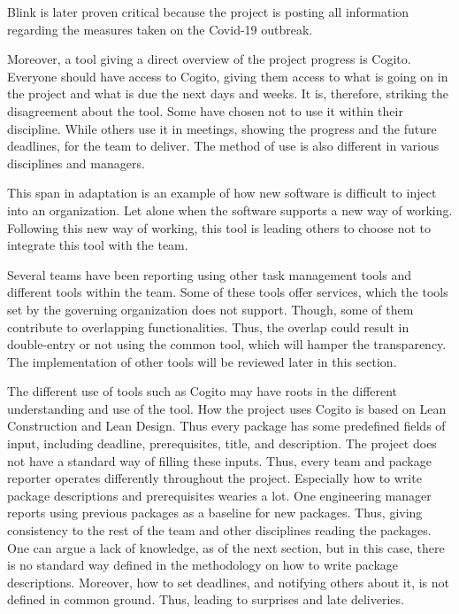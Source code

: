 Blink is later proven critical because the project is posting all information regarding the measures taken on the Covid-19 outbreak.

Moreover, a tool giving a direct overview of the project progress is Cogito.  Everyone should have access to Cogito, giving them access to what is going on in the project and what is due the next days and weeks. It is, therefore, striking the disagreement about the tool. Some have chosen not to use it within their discipline. While others use it in meetings, showing the progress and the future deadlines, for the team to deliver. The method of use is also different in various disciplines and managers. 

This span in adaptation is an example of how new software is difficult to inject into an organization. Let alone when the software supports a new way of working. Following this new way of working, this tool is leading others to choose not to integrate this tool with the team.

Several teams have been reporting using other task management tools and different tools within the team. Some of these tools offer services, which the tools set by the governing organization does not support. Though, some of them contribute to overlapping functionalities. Thus, the overlap could result in double-entry or not using the common tool, which will hamper the transparency. The implementation of other tools will be reviewed later in this section. 

The different use of tools such as Cogito may have roots in the different understanding and use of the tool. How the project uses Cogito is based on Lean Construction and Lean Design. Thus every package has some predefined fields of input, including deadline, prerequisites, title, and description. The project does not have a standard way of filling these inputs. Thus, every team and package reporter operates differently throughout the project. Especially how to write package descriptions and prerequisites wearies a lot. 
One engineering manager reports using previous packages as a baseline for new packages. Thus, giving consistency to the rest of the team and other disciplines reading the packages. One can argue a lack of knowledge, as of the next section, but in this case, there is no standard way defined in the methodology on how to write package descriptions. Moreover, how to set deadlines, and notifying others about it, is not defined in common ground. Thus, leading to surprises and late deliveries. 

